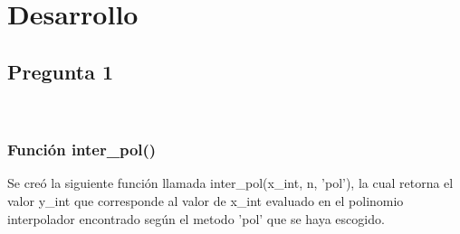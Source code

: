 \documentclass[letter, 10pt]{article}
\begin{document}
\newpage

\section{ Desarrollo }

\subsection{Pregunta 1}\\
\subsubsection{Funci\'on inter\_pol()} Se cre\'o la siguiente funci\'on llamada inter\_pol(x\_int, n, 'pol'), la cual retorna el valor y\_int que corresponde al valor de x\_int evaluado en el polinomio interpolador encontrado seg\'un el metodo 'pol' que se haya escogido.
\end{document}
